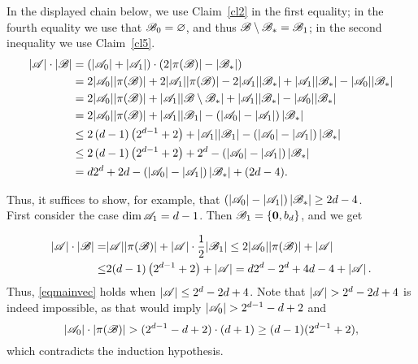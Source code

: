         In the displayed chain below, we use Claim~\ref{cl2} in the first equality; in the fourth equality we use that ${\mathscr{B}}_0 = \varnothing$, and thus ${\mathscr{B}}\setminus {\mathscr{B}}_*={\mathscr{B}}_1$; in the second inequality we use  Claim~\ref{cl5}.
        \begin{align}
            |{\mathscr{A}}|\cdot|{\mathscr{B}}|& = (|{\mathscr{A}}_0|+|{\mathscr{A}}_1|)\cdot(2|\pi({\mathscr{B}})|-|{\mathscr{B}}_*|)\nonumber\\
            & = 2|{\mathscr{A}}_0||\pi({\mathscr{B}})| + 2|{\mathscr{A}}_1||\pi({\mathscr{B}})|- 2|{\mathscr{A}}_1||{\mathscr{B}}_*| + |{\mathscr{A}}_1||{\mathscr{B}}_*| - |{\mathscr{A}}_0||{\mathscr{B}}_*|  \nonumber\\
            & = 2|{\mathscr{A}}_0||\pi({\mathscr{B}})|  + |{\mathscr{A}}_1||{\mathscr{B}} \setminus {\mathscr{B}}_*| + |{\mathscr{A}}_1||{\mathscr{B}}_*|- |{\mathscr{A}}_0||{\mathscr{B}}_*| \nonumber\\
            & = 2|{\mathscr{A}}_0||\pi({\mathscr{B}})|+|{\mathscr{A}}_1||{\mathscr{B}}_1|-\left(|{\mathscr{A}}_0|-|{\mathscr{A}}_1|\right)|{\mathscr{B}}_*| \label{general} \\
            & \leq 2\left(d-1\right)\left(2^{d-1}+2\right)+|{\mathscr{A}}_1||{\mathscr{B}}_1|-\left(|{\mathscr{A}}_0|-|{\mathscr{A}}_1|\right)|{\mathscr{B}}_*| \label{general_ind} \\
            & \leq 2\left(d-1\right)\left(2^{d-1}+2\right)+2^{d}-\left(|{\mathscr{A}}_0|-|{\mathscr{A}}_1|\right)|{\mathscr{B}}_*| \nonumber \\
            & = d 2^{d} + 2d - \left(|{\mathscr{A}}_0|-|{\mathscr{A}}_1|\right)|{\mathscr{B}}_*| + (2d-4). \label{2d_minus_4}
        \end{align}
        
        \noindent Thus, it suffices to show, for example, that 
        $\left(\left|{\mathscr{A}}_0\right|-\left|{\mathscr{A}}_1\right|\right)\left|{\mathscr{B}}_*\right|\geq 2d-4$. \\
        \noindent First consider the case  $\operatorname{dim}{\mathscr{A}}_1=d-1$. Then ${\mathscr{B}}_1=\{\mathbf{0}, b_d\}$, and we get 
        
        \begin{align*}
|{\mathscr{A}}|\cdot|{\mathscr{B}}|=&|{\mathscr{A}}||\pi({\mathscr{B}})|+|{\mathscr{A}}|\cdot\frac{1}{2}|{\mathscr{B}}_1|\leq 2|{\mathscr{A}}_0||\pi({\mathscr{B}})| + |{\mathscr{A}}| \\ 
\leq& 2(d-1)\left(2^{d-1}+2\right)+ |{\mathscr{A}}| =  d 2^d  - 2^d +4d-4+ \left|{\mathscr{A}}\right|.
        \end{align*}
        Thus, \eqref{eqmainvec} holds when $\left|{\mathscr{A}}\right|\leq 2^d-2d+4 $. Note that $\left|\aaa\right|> 2^d-2d+4$ is indeed impossible, as that would imply $\left|\aaa_0\right|> 2^{d-1}-d+2$ and
        \begin{equation*}
            \left|{\mathscr{A}}_0\right|\cdot\left|\pi({\mathscr{B}})\right| > (2^{d-1}-d+2)\cdot(d+1)\geq(d-1)(2^{d-1}+2),
        \end{equation*}
        which contradicts the induction hypothesis. 
        
